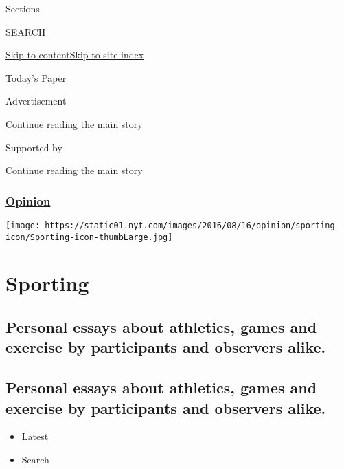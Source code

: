 Sections

SEARCH

\protect\hyperlink{site-content}{Skip to
content}\protect\hyperlink{site-index}{Skip to site index}

\href{https://myaccount.nytimes.com/auth/login?response_type=cookie\&client_id=vi}{}

\href{https://www.nytimes.com/section/todayspaper}{Today's Paper}

Advertisement

\protect\hyperlink{after-top}{Continue reading the main story}

Supported by

\protect\hyperlink{after-sponsor}{Continue reading the main story}

\hypertarget{opinion}{%
\subsubsection{\texorpdfstring{\href{/section/opinion}{Opinion}}{Opinion}}\label{opinion}}

\texttt{[image: https://static01.nyt.com/images/2016/08/16/opinion/sporting-icon/Sporting-icon-thumbLarge.jpg]}

\hypertarget{sporting}{%
\section{Sporting}\label{sporting}}

\hypertarget{personal-essays-about-athletics-games-and-exercise-by-participants-and-observers-alike}{%
\subsection{Personal essays about athletics, games and exercise by
participants and observers
alike.}\label{personal-essays-about-athletics-games-and-exercise-by-participants-and-observers-alike}}

\hypertarget{personal-essays-about-athletics-games-and-exercise-by-participants-and-observers-alike-1}{%
\subsection{Personal essays about athletics, games and exercise by
participants and observers
alike.}\label{personal-essays-about-athletics-games-and-exercise-by-participants-and-observers-alike-1}}

\begin{itemize}
\tightlist
\item
  \protect\hyperlink{stream-panel}{Latest}
\item
  Search
\end{itemize}


